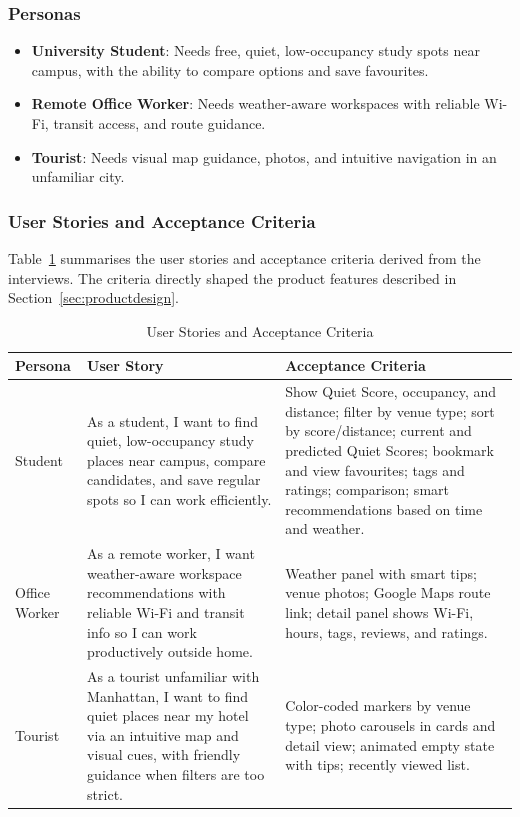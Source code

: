 \documentclass[conference]{IEEEtran}
\begin{document}
\subsubsection{Personas}

\begin{itemize}
  \item \textbf{University Student}: Needs free, quiet, low-occupancy study spots near campus, with the ability to compare options and save favourites.
  \item \textbf{Remote Office Worker}: Needs weather-aware workspaces with reliable Wi-Fi, transit access, and route guidance.
  \item \textbf{Tourist}: Needs visual map guidance, photos, and intuitive navigation in an unfamiliar city.
\end{itemize}

\subsubsection{User Stories and Acceptance Criteria}

Table~\ref{tab:userstories} summarises the user stories and acceptance criteria derived from the interviews. The criteria directly shaped the product features described in Section~\ref{sec:productdesign}.

\begin{table}[htbp]
\caption{User Stories and Acceptance Criteria}
\label{tab:userstories}
\begin{center}
\small
\setlength{\tabcolsep}{2pt}
\begin{tabular}{|p{}|p{}|p{}|}
\hline
\textbf{Persona} & \textbf{User Story} & \textbf{Acceptance Criteria} \\
\hline
Student & As a student, I want to find quiet, low-occupancy study places near campus, compare candidates, and save regular spots so I can work efficiently. & Show Quiet Score, occupancy, and distance; filter by venue type; sort by score/distance; current and predicted Quiet Scores; bookmark and view favourites; tags and ratings; comparison; smart recommendations based on time and weather. \\
\hline
Office Worker & As a remote worker, I want weather-aware workspace recommendations with reliable Wi-Fi and transit info so I can work productively outside home. & Weather panel with smart tips; venue photos; Google Maps route link; detail panel shows Wi-Fi, hours, tags, reviews, and ratings. \\
\hline
Tourist & As a tourist unfamiliar with Manhattan, I want to find quiet places near my hotel via an intuitive map and visual cues, with friendly guidance when filters are too strict. & Color-coded markers by venue type; photo carousels in cards and detail view; animated empty state with tips; recently viewed list. \\
\hline
\end{tabular}
\setlength{\tabcolsep}{6pt}
\end{center}
\end{table}
\end{document}

